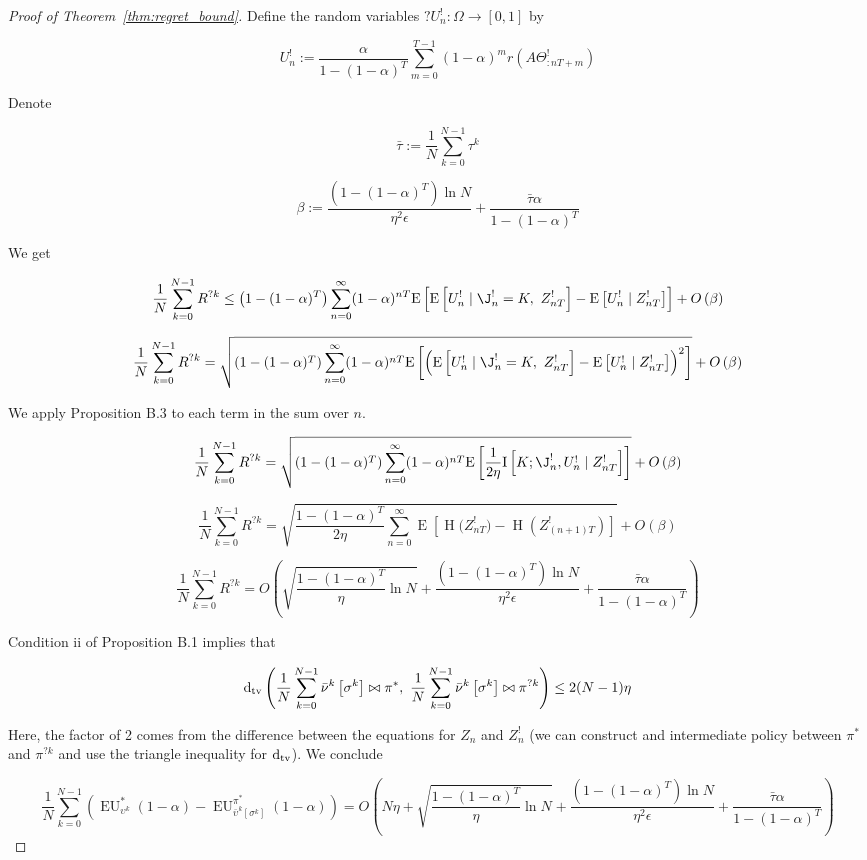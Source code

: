 \documentclass[anon,12pt]{colt2018} %
\newcommand{\AP}[1]{\left(#1\right)}
\newcommand{\AB}[1]{\left[#1\right]}
\newcommand{\E}[1]{\underset{#1}{\operatorname{E}}}
\newcommand{\I}[1]{\underset{#1}{\operatorname{I}}}
\newcommand{\En}{\operatorname{H}}
\newcommand{\Dtv}{\operatorname{d}_{\textnormal{tv}}}
\newcommand{\EU}{\operatorname{EU}}
\begin{document}
\begin{proof}[Proof of Theorem~\ref{thm:regret_bound}]
Define the random variables $?{U^!_n : \Omega \rightarrow [0,1]}$ by 

$$U^!_n:=\frac{\alpha}{1-(1-\alpha)^T}\sum_{m=0}^{T-1} (1-\alpha)^{m} r\left(A\Theta^!_{:nT+m}\right)$$

Denote 

$$\bar{\tau} := \frac{1}{N}\sum_{k=0}^{N-1} {\tau^k}$$

$$\beta:=\frac{\AP{1-(1-\alpha)^T}\ln N}{\eta^2\epsilon}+\frac{\bar{\tau}\alpha}{1-(1-\alpha)^T}$$

We get

$$\frac{1}{N}\sum_{k=0}^{N-1}R^{?k} \leq \AP{1-(1-\alpha)^T}\sum_{n=0}^\infty (1-\alpha)^{nT} \E{}\left[\E{}\left[U^!_n \mid \J^!_n = K,\ Z^!_{nT}\right]-\E{}\left[U^!_n \mid Z^!_{nT}\right]\right] + O\AP{\beta}$$

$$\frac{1}{N}\sum_{k=0}^{N-1}R^{?k} = \sqrt{\AP{1-(1-\alpha)^T}\sum_{n=0}^\infty (1-\alpha)^{nT} \E{}\left[\left(\E{}\left[U^!_n \mid \J^!_n = K,\ Z^!_{nT}\right]-\E{}\left[U^!_n \mid Z^!_{nT}\right]\right)^2\right]} +  O\AP{\beta}$$

We apply Proposition B.3 to each term in the sum over $n$.

$$\frac{1}{N}\sum_{k=0}^{N-1}R^{?k} = \sqrt{\AP{1-(1-\alpha)^T}\sum_{n=0}^\infty (1-\alpha)^{nT} \E{}\left[\frac{1}{2\eta}\I{}\left[K;\J^!_n,U^!_n \mid Z^!_{nT}\right]\right]} +  O\AP{\beta}$$

$$\frac{1}{N}\sum_{k=0}^{N-1}R^{?k} = \sqrt{\frac{1-(1-\alpha)^T}{2\eta}\sum_{n=0}^\infty \E{}\left[\En\Big(Z^!_{nT}\Big)-\En\left(Z^!_{(n+1)T}\right)\right]} + O\AP{\beta}$$

$$\frac{1}{N}\sum_{k=0}^{N-1}R^{?k} = O\left(\sqrt{\frac{1-(1-\alpha)^T}{\eta}\ln N}  +\frac{\AP{1-(1-\alpha)^T}\ln N}{\eta^2\epsilon}+\frac{\bar{\tau}\alpha}{1-(1-\alpha)^T}\right)$$

Condition ii of Proposition B.1 implies that

$$\Dtv\left(\frac{1}{N}\sum_{k=0}^{N-1}{\bar{\nu}^k\left[\sigma^k\right]\bowtie\pi^*},\ \frac{1}{N}\sum_{k=0}^{N-1}{\bar{\nu}^k\left[\sigma^k\right]\bowtie\pi^{?k}}\right) \leq 2(N-1)\eta$$

Here, the factor of 2 comes from the difference between the equations for $Z_n$ and $Z^!_n$ (we can construct and intermediate policy between $\pi^*$ and $\pi^{?k}$ and use the triangle inequality for $\Dtv$). We conclude

$$\frac{1}{N}\sum_{k=0}^{N-1}\AP{\EU^{*}_{\upsilon^k}(1-\alpha)-\EU^{\pi^{*}}_{\bar{\upsilon}^k\AB{\sigma^k}}(1-\alpha)} = O\left(N\eta +\sqrt{\frac{1-(1-\alpha)^T}{\eta}\ln N}  +\frac{\AP{1-(1-\alpha)^T}\ln N}{\eta^2\epsilon}+\frac{\bar{\tau}\alpha}{1-(1-\alpha)^T}\right)$$


\end{proof}
\end{document}
